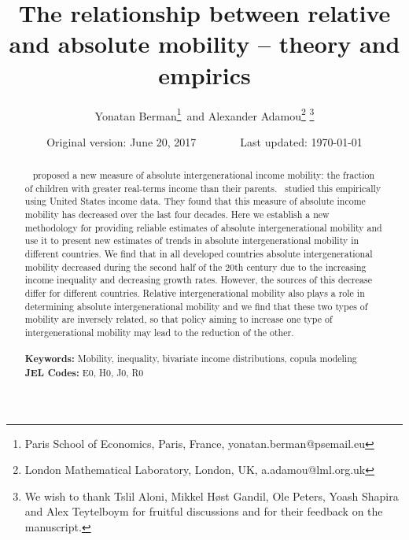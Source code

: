 \documentclass[12pt,a4paper]{article}
\numberwithin{equation}{section}
\begin{document}
\onehalfspacing

\begin{titlepage}
\title{The relationship between relative and absolute mobility -- theory and empirics}
\author{Yonatan Berman\footnote{Paris School of Economics, Paris, France, yonatan.berman@psemail.eu}\, and Alexander Adamou\footnote{London Mathematical Laboratory, London, UK, a.adamou@lml.org.uk} \thanks{We wish to thank Tslil Aloni, Mikkel H\o st Gandil, Ole Peters, Yoash Shapira and Alex Teytelboym for fruitful discussions and for their feedback on the manuscript.}}
\date{Original version: June 20, 2017\,\,\,\,\,\,\,\,\,\,\,\,\,\,\,\,\,\,\,\,\,\,\,\,Last updated: \today}
\maketitle
\begin{abstract}
\noindent~\citet{chetty2014land} proposed a new measure of absolute intergenerational income mobility: the fraction of children with greater real-terms income than their parents.~\citet{chetty2017fading} studied this empirically using United States income data. They found that this measure of absolute income mobility has decreased over the last four decades.
Here we establish a new methodology for providing reliable estimates of absolute intergenerational mobility and use it to present new estimates of trends in absolute intergenerational mobility in different countries.
We find that in all developed countries absolute intergenerational mobility decreased during the second half of the 20th century due to the increasing income inequality and decreasing growth rates. However, the sources of this decrease differ for different countries. Relative intergenerational mobility also plays a role in determining absolute intergenerational mobility and we find that these two types of mobility are inversely related, so that policy aiming to increase one type of intergenerational mobility may lead to the reduction of the other.
\\
\\
\noindent\textbf{Keywords:} Mobility, inequality, bivariate income distributions, copula modeling
\\
\noindent\textbf{JEL Codes:} E0, H0, J0, R0\\

\bigskip
\end{abstract}
\setcounter{page}{0}
\thispagestyle{empty}
\end{titlepage}
\pagebreak \newpage
\end{document}
